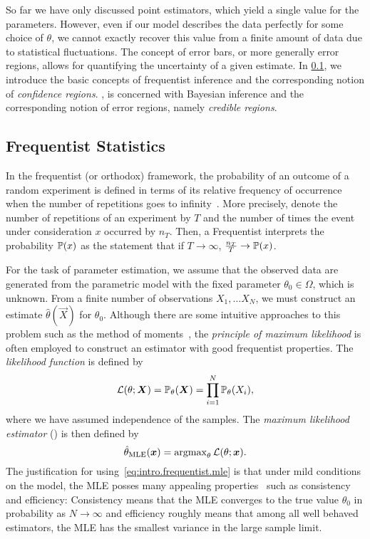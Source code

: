 So far we have only discussed point estimators, which yield a single value for the parameters.
However, even if our model describes the data perfectly for some choice of $\theta$, we cannot exactly recover this value from a finite amount of data due to statistical fluctuations.
The concept of error bars, or more generally error regions, allows for quantifying the uncertainty of a given estimate.
In \cref{sub:intro.frequentist}, we introduce the basic concepts of frequentist inference and the corresponding notion of \emph{confidence regions}.
, is concerned with Bayesian inference and the corresponding notion of error regions, namely \emph{credible regions}.



\subsection{Frequentist Statistics}
\label{sub:intro.frequentist}

In the frequentist (or orthodox) framework, the probability of an outcome of a random experiment is defined in terms of its relative frequency of occurrence when the number of repetitions goes to infinity~\cite{Keynes_2007_Treatise,Kiefer_2012_Introduction}.
More precisely, denote the number of repetitions of an experiment by $T$ and the number of times the event under consideration $x$ occurred by $n_T$.
Then, a Frequentist interprets the probability $\mathbb{P}(x)$ as the statement that if $T \to \infty$, $\frac{n_T}{T} \to \mathbb{P}(x)$.

For the task of parameter estimation, we assume that the observed data are generated from the parametric model with the fixed  parameter $\theta_0 \in \Omega$, which is unknown.
From a finite number of observations $X_1, \ldots X_N$, we must construct an estimate $\hat\theta(\vec X)$ for $\theta_0$.
Although there are some intuitive approaches to this problem such as the method of moments~\cite[Sec.\ 9.2]{Wasserman_2013_All}, the \emph{principle of maximum likelihood} is often employed to construct an estimator with good frequentist properties.
The \emph{likelihood function} is defined by
\[
  \mathcal{L}(\theta; {\boldsymbol{X}}) = \mathbb{P}_\theta({\boldsymbol{X}}) = \prod_{i=1}^N \mathbb{P}_\theta(X_i),
  \label{eq:intro.frequentist.likelihood_function}
\]
where we have assumed independence of the samples.
The \emph{maximum likelihood estimator} () is then defined by
\[
  \hat{\theta}_\mathrm{MLE}({\boldsymbol{x}}) = \operatorname{argmax}_\theta \mathcal{L}(\theta; {\boldsymbol{x}}).
  \label{eq:intro.frequentist.mle}
\]
The justification for using~\eqref{eq:intro.frequentist.mle} is that under mild conditions on the model, the MLE posses many appealing properties~\cite[Sec.\ 9.4]{Wasserman_2013_All} such as consistency and efficiency:
Consistency means that the MLE converges to the true value $\theta_0$ in probability as $N \to \infty$ and efficiency roughly means that among all well behaved estimators, the MLE has the smallest variance in the large sample limit.\\


